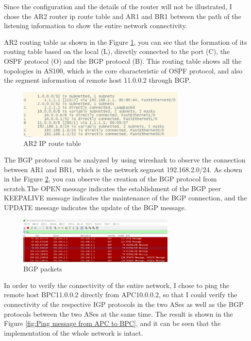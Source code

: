 \documentclass[12pt]{article}
\begin{document}
Since the configuration and the details of the router will not be illustrated, I chose the AR2 router ip route table and AR1 and BR1 between the path of the listening information to show the entire network connectivity. 

AR2 routing table as shown in the Figure \ref{fig:AR2 IP route table}, you can see that the formation of its routing table based on the local (L), directly connected to the port (C), the OSPF protocol (O) and the BGP protocol (B). This routing table shows all the topologies in AS100, which is the core characteristic of OSPF protocol, and also the segment information of remote host 11.0.0.2 through BGP.

\begin{figure}[h]
    \centering
    \includegraphics[width=0.75\textwidth,keepaspectratio]{Graph/AR2 ip route.png}
    \caption{AR2 IP route table} 
    \label{fig:AR2 IP route table} 
\end{figure}

The BGP protocol can be analyzed by using wireshark to observe the connection between AR1 and BR1, which is the network segment 192.168.2.0/24. As shown in the Figure \ref{fig:BGP packets}, you can observe the creation of the BGP protocol from scratch.The OPEN message indicates the establishment of the BGP peer KEEPALIVE message indicates the maintenance of the BGP connection, and the UPDATE message indicates the update of the BGP message.

\begin{figure}[h]
    \centering
    \includegraphics[width=0.7\textwidth,keepaspectratio]{Graph/BGP packets.png}
    \caption{BGP packets} 
    \label{fig:BGP packets} 
\end{figure}

In order to verify the connectivity of the entire network, I chose to ping the remote host BPC11.0.0.2 directly from APC10.0.0.2, so that I could verify the connectivity of the respective IGP protocols in the two ASes as well as the BGP protocols between the two ASes at the same time. The result is shown in the Figure \ref{fig:Ping message from APC to BPC}, and it can be seen that the implementation of the whole network is intact.
\end{document}
